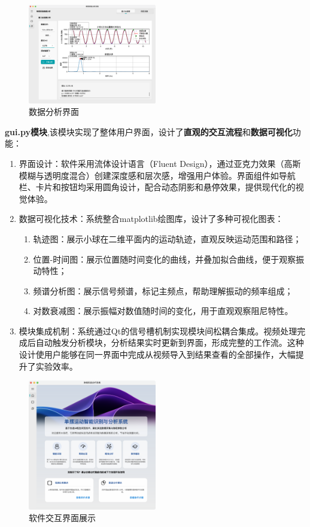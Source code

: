 \begin{figure}[H]
    \centering
    \includegraphics[width=0.5\textwidth]{figures/数据分析界面.png}
    \caption{数据分析界面}
    \label{fig:data_analysis}
\end{figure}

\textbf{gui.py模块},该模块实现了整体用户界面，设计了\textbf{直观的交互流程}和\textbf{数据可视化}功能：

\begin{enumerate}
    \item 界面设计：软件采用流体设计语言（Fluent Design），通过亚克力效果（高斯模糊与透明度混合）创建深度感和层次感，增强用户体验。界面组件如导航栏、卡片和按钮均采用圆角设计，配合动态阴影和悬停效果，提供现代化的视觉体验。      
    \item 数据可视化技术：系统整合matplotlib绘图库，设计了多种可视化图表：
    \begin{enumerate}[label=\alph*.]
        \item 轨迹图：展示小球在二维平面内的运动轨迹，直观反映运动范围和路径；
        \item 位置-时间图：展示位置随时间变化的曲线，并叠加拟合曲线，便于观察振动特性；
        \item 频谱分析图：展示信号频谱，标记主频点，帮助理解振动的频率组成；
        \item 对数衰减图：展示振幅对数值随时间的变化，用于直观观察阻尼特性。
    \end{enumerate}
    
    \item 模块集成机制：系统通过Qt的信号槽机制实现模块间松耦合集成。视频处理完成后自动触发分析模块，分析结果实时更新到界面，形成完整的工作流。这种设计使用户能够在同一界面中完成从视频导入到结果查看的全部操作，大幅提升了实验效率。
\end{enumerate}


\begin{figure}[H]
    \centering
    \includegraphics[width=0.5\textwidth]{figures/软件界面1.png}
    \caption{软件交互界面展示}
    \label{fig:software_interface}
\end{figure}


